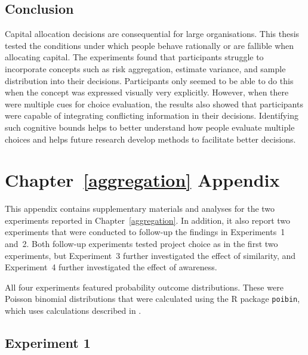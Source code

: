\documentclass[a4paper, nobind]{templates/ociamthesis}
\theoremstyle{definition}
\theoremstyle{definition}
\theoremstyle{definition}
\theoremstyle{definition}
\theoremstyle{remark}
\begin{document}
\hypertarget{conclusion}{%
\section{Conclusion}\label{conclusion}}

Capital allocation decisions are consequential for large organisations. This
thesis tested the conditions under which people behave rationally or are
fallible when allocating capital. The experiments found that participants
struggle to incorporate concepts such as risk aggregation, estimate variance,
and sample distribution into their decisions. Participants only seemed to be
able to do this when the concept was expressed visually very explicitly.
However, when there were multiple cues for choice evaluation, the results also
showed that participants were capable of integrating conflicting information in
their decisions. Identifying such cognitive bounds helps to better understand
how people evaluate multiple choices and helps future research develop methods
to facilitate better decisions.

\newpage

\printbibliography[segment=\therefsegment,heading=subbibintoc]

\appendix


\hypertarget{aggregation-appendix}{%
\chapter{Chapter~\ref{aggregation} Appendix}\label{aggregation-appendix}}

\minitoc

This appendix contains supplementary materials and analyses for the two
experiments reported in Chapter~\ref{aggregation}. In addition, it also report
two experiments that were conducted to follow-up the findings in Experiments~1
and~2. Both follow-up experiments tested project choice as in the first two
experiments, but Experiment~3 further investigated the effect of similarity, and
Experiment~4 further investigated the effect of awareness.

All four experiments featured probability outcome distributions. These were
Poisson binomial distributions that were calculated using the R package
\texttt{poibin}, which uses calculations described in \textcite{hong2013}.

\section{Experiment 1}
\end{document}
